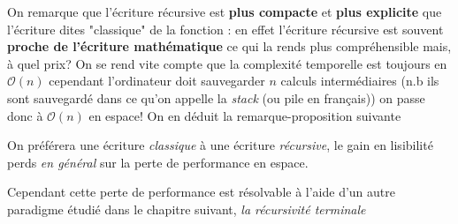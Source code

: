 \documentclass[hidelinks]{article}
\begin{document}
    On remarque que l'écriture récursive est \textbf{plus compacte} et \textbf{plus explicite} que l'écriture dites "classique" de 
    la fonction : en effet l'écriture récursive est souvent \textbf{proche de l'écriture mathématique} ce qui la rends plus compréhensible
    mais, à quel prix? On se rend vite compte que la complexité temporelle est toujours en $\mathcal{O}(n)$ cependant l'ordinateur doit 
    sauvegarder $n$ calculs intermédiaires (n.b ils sont sauvegardé dans ce qu'on appelle la \textit{stack} (ou pile en français)) 
    on passe donc à $\mathcal{O}(n)$ en espace! On en déduit la remarque-proposition suivante 
    \begin{prop}
        On préférera une écriture \textit{classique} à une écriture \textit{récursive}, le gain en lisibilité perds \textit{en général}
        sur la perte de performance en espace.
    \end{prop}
    Cependant cette perte de performance est résolvable à l'aide d'un autre paradigme étudié dans le chapitre suivant, \textit{la récursivité terminale}
\end{document}
